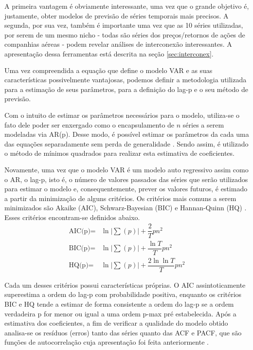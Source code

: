\documentclass[12pt]{article}
\begin{document}
	A primeira vantagem é obviamente interessante, uma vez que o grande objetivo é, justamente, obter modelos de previsão de séries temporais mais precisos. A segunda, por sua vez, também é importante uma vez que as 10 séries utilizadas, por serem de um mesmo nicho - todas são séries dos preços/retornos de ações de companhias aéreas - podem revelar análises de interconexão interessantes. A apresentação dessa ferramentas está descrita na seção \ref{sec:interconex}.
	
	Uma vez compreendida a equação que define o modelo VAR e as suas características possivelmente vantajosas, podemos definir a metodologia utilizada para a estimação de seus parâmetros, para a definição do \textrm{lag-p} e o seu método de previsão.
	
	Com o intuito de estimar os parâmetros necessários para o modelo, utiliza-se o fato dele poder ser enxergado como o encapsulamento de $n$ séries a serem modeladas via AR(p). Desse modo, é possível estimar os parâmetros da cada uma das equações separadamente sem perda de generalidade \cite{VAR}. Sendo assim, é utilizado o método de mínimos quadrados para realizar esta estimativa de coeficientes.
	
	Novamente, uma vez que o modelo VAR é um modelo auto regressivo assim como o AR, o \textrm{lag-p}, isto é, o número de valores passados das séries que serão utilizados para estimar o modelo e, consequentemente, prever os valores futuros, é estimado a partir da minimização de alguns critérios. Os critérios mais comuns a serem minimizados são \textrm{Akaike} (AIC), \textrm{Schwarz-Bayesian} (BIC) e \textrm{Hannan-Quinn} (HQ) \cite{VAR}. Esses critérios encontram-se definidos abaixo.
	\begin{align*}
		\textrm{AIC(p)}=&\ln\left|\sum(p)\right|+\dfrac{2}{T}pn^2\\
		\textrm{BIC(p)}=&\ln\left|\sum(p)\right|+\dfrac{\ln T}{T}pn^2\\
		\textrm{HQ(p)}=&\ln\left|\sum(p)\right|+\dfrac{2\ln \ln T}{T}pn^2
	\end{align*}

	Cada um desses critérios possui características próprias. O AIC assintoticamente superestima a ordem do \textrm{lag-p} com probabilidade positiva, enquanto os critérios BIC e HQ tende a estimar de forma consistente a ordem do \textrm{lag-p} se a ordem verdadeira \textrm{p} for menor ou igual a uma ordem \textrm{p-max} pré estabelecida. Após a estimativa dos coeficientes, a fim de verificar a qualidade do modelo obtido analisa-se os resíduos (erros) tanto das séries quanto das ACF e PACF, que são funções de autocorrelação cuja apresentação foi feita anteriormente \cite{Tsay-Tiao1984}.
	
\end{document}
